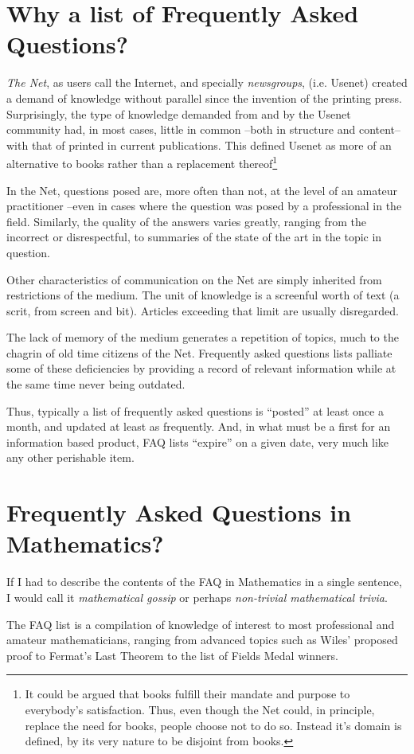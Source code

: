 \section{Why a list of Frequently Asked Questions?}

{\it The Net}, as users call the Internet, and specially {\it
newsgroups}, (i.e. Usenet) created a demand of knowledge without
parallel since the invention of the printing press.  Surprisingly, the
type of knowledge demanded from and by the Usenet community had, in
most cases, little in common --both in structure and content-- with
that of printed in current publications. This defined Usenet as more of an
alternative to books rather than a replacement thereof\footnote{It could be
argued that books fulfill their mandate and purpose to everybody's
satisfaction.  Thus, even though the Net could, in principle, replace
the need for books, people choose not to do so. Instead it's domain is
defined, by its very nature to be disjoint from books.}

In the Net, questions posed are, more often than not, at the level 
of an amateur practitioner --even in cases where the question
was posed by a professional in the field. Similarly, the quality of the
answers  varies greatly, ranging from the incorrect or disrespectful,
to summaries of the state of the art in the topic in question.

Other characteristics of communication on the Net are simply inherited
from restrictions of the medium. The unit of knowledge is a screenful
worth of text (a scrit, from screen and bit). Articles exceeding that
limit are usually disregarded.

The lack of memory of the medium generates a repetition of topics,
much to the chagrin of old time citizens of the Net. 
Frequently asked questions lists palliate some of these deficiencies by
providing a record of relevant information while at the same time 
never being outdated. 

Thus, typically a list of frequently asked questions is ``posted''
at least once a month, and updated at least as frequently. And,
in what must be a first for an information based product, FAQ lists 
``expire'' on a given date, very much like any other  perishable item.


\section{Frequently Asked Questions in Mathematics?}

If I had to describe the contents of the FAQ in Mathematics
in a single sentence, I would call it {\it mathematical gossip}
or perhaps {\it non-trivial mathematical trivia}.

The FAQ list is a compilation of knowledge of interest to most
professional and amateur mathematicians, ranging from advanced
topics such as Wiles' proposed proof to Fermat's Last Theorem
to the list of Fields Medal winners.
